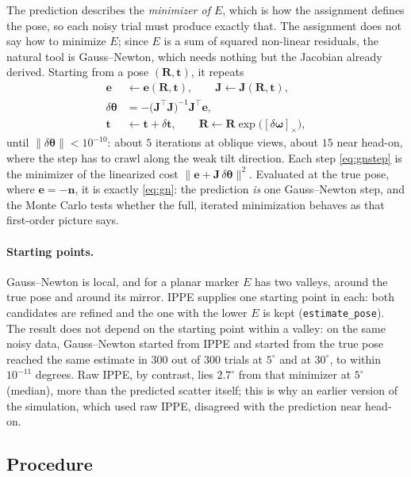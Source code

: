 \documentclass[11pt,a4paper]{article}
\theoremstyle{remark}
\newcommand{\Rmat}{\mathbf{R}}
\newcommand{\Jmat}{\mathbf{J}}
\newcommand{\evec}{\mathbf{e}}
\newcommand{\nvec}{\mathbf{n}}
\newcommand{\tvec}{\mathbf{t}}
\newcommand{\dth}{\delta\boldsymbol{\theta}}
\newcommand{\dom}{\delta\boldsymbol{\omega}}
\newcommand{\dtv}{\delta\mathbf{t}}
\newcommand{\skewm}[1]{[#1]_{\times}}
\begin{document}
The prediction describes the \emph{minimizer of $E$}, which is how the
assignment defines the pose, so each noisy trial must produce exactly that. The
assignment does not say how to minimize $E$; since $E$ is a sum of squared
non-linear residuals, the natural tool is Gauss--Newton, which needs nothing but
the Jacobian already derived. Starting from a pose $(\Rmat,\tvec)$, it repeats
\begin{align}
  \evec &\leftarrow \evec(\Rmat,\tvec), \qquad
  \Jmat \leftarrow \Jmat(\Rmat,\tvec), \nonumber \\
  \dth &= -\big(\Jmat^{\top}\Jmat\big)^{-1}\Jmat^{\top}\evec ,
  \label{eq:gnstep} \\
  \tvec &\leftarrow \tvec + \dtv, \qquad
  \Rmat \leftarrow \Rmat\exp\!\big(\skewm{\dom}\big), \nonumber
\end{align}
until $\|\dth\| < 10^{-10}$: about $5$ iterations at oblique views, about $15$
near head-on, where the step has to crawl along the weak tilt direction. Each
step \eqref{eq:gnstep} is the minimizer of the linearized cost
$\|\evec + \Jmat\,\dth\|^2$. Evaluated at the true pose, where $\evec = -\nvec$,
it is exactly \eqref{eq:gn}: the prediction \emph{is} one Gauss--Newton step, and
the Monte Carlo tests whether the full, iterated minimization behaves as that
first-order picture says.

\paragraph{Starting points.} Gauss--Newton is local, and for a planar marker
$E$ has two valleys, around the true pose and around its mirror. IPPE supplies
one starting point in each: both candidates are refined and the one with the
lower $E$ is kept (\texttt{estimate\_pose}). The result does not depend on the
starting point within a valley: on the same noisy data, Gauss--Newton started
from IPPE and started from the true pose reached the same estimate in $300$ out
of $300$ trials at $5^{\circ}$ and at $30^{\circ}$, to within $10^{-11}$ degrees.
Raw IPPE, by contrast, lies $2.7^{\circ}$ from that minimizer at $5^{\circ}$
(median), more than the predicted scatter itself; this is why an earlier version
of the simulation, which used raw IPPE, disagreed with the prediction near
head-on.

\subsection{Procedure}
\end{document}
